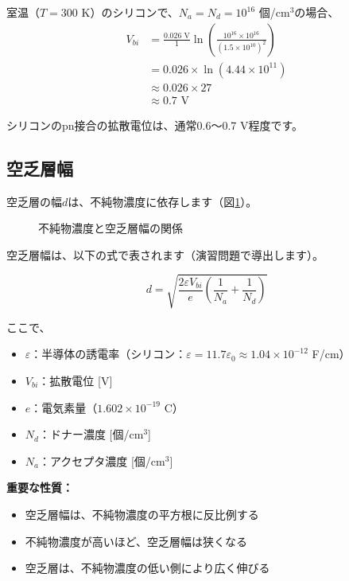 室温（$T = 300$ K）のシリコンで、$N_a = N_d = 10^{16}$ 個/cm$^3$の場合、
\begin{align}
V_{bi} &= \frac{0.026 \text{ V}}{1} \ln\left(\frac{10^{16} \times 10^{16}}{(1.5 \times 10^{10})^2}\right) \\
&= 0.026 \times \ln(4.44 \times 10^{11}) \\
&\approx 0.026 \times 27 \\
&\approx 0.7 \text{ V}
\end{align}

シリコンのpn接合の拡散電位は、通常0.6〜0.7 V程度です。

\subsection{空乏層幅}

空乏層の幅$d$は、不純物濃度に依存します（図\ref{fig:depletion_width}）。

\begin{figure}[H]
\centering
{}
\caption{不純物濃度と空乏層幅の関係}
\label{fig:depletion_width}
\end{figure}

空乏層幅は、以下の式で表されます（演習問題で導出します）。

\begin{equation}
d = \sqrt{\frac{2\varepsilon V_{bi}}{e}\left(\frac{1}{N_a} + \frac{1}{N_d}\right)}
\end{equation}

ここで、
\begin{itemize}
\item $\varepsilon$：半導体の誘電率（シリコン：$\varepsilon = 11.7 \varepsilon_0 \approx 1.04 \times 10^{-12}$ F/cm）
\item $V_{bi}$：拡散電位 [V]
\item $e$：電気素量（$1.602 \times 10^{-19}$ C）
\item $N_d$：ドナー濃度 [個/cm$^3$]
\item $N_a$：アクセプタ濃度 [個/cm$^3$]
\end{itemize}

\textbf{重要な性質：}
\begin{itemize}
\item 空乏層幅は、不純物濃度の平方根に反比例する
\item 不純物濃度が高いほど、空乏層幅は狭くなる
\item 空乏層は、不純物濃度の低い側により広く伸びる
\end{itemize}

